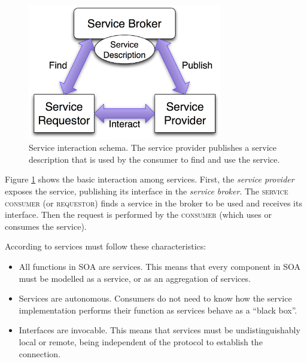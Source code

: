 \begin{figure}
\centering
\includegraphics[width=20pc]{gfx/soa/soaDiagram.jpg}
\caption{Service interaction schema. The service provider publishes a
  service description that is used by the consumer to find and use the
  service.} %
\label{fig:soadiagram}
\end{figure}




Figure \ref{fig:soadiagram} shows the basic interaction among
services. First, the {\em service provider} exposes the service, publishing
its interface in the {\em service broker}. The \textsc{service consumer} (or
\textsc{requestor}) finds  a service in the broker to be used and receives its
interface. Then the request is performed by the \textsc{consumer} (which uses or
consumes the service).  

According to  \cite{Channabasavaiah2003migrating} services must follow these  characteristics:

\begin{itemize}
\item All functions in SOA are services. This means that every
  component in SOA must be modelled as a service, or as an aggregation of services. 
\item Services are autonomous. Consumers do not need to know how the service implementation performs their function as services behave as a ``black box''.
\item Interfaces are invocable. This means that services must be
  undistinguishably local or remote, being independent of the protocol
  to establish the connection. %
\end{itemize}


